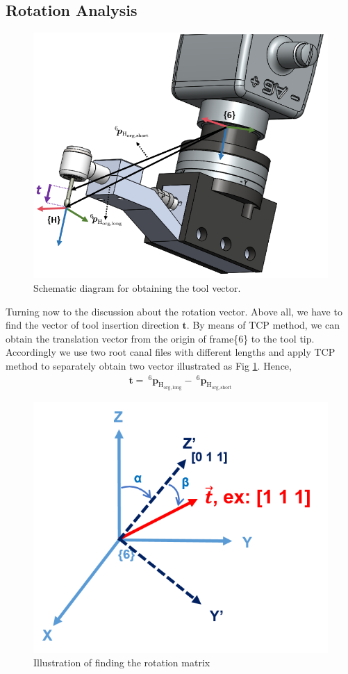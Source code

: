 \subsection{Rotation Analysis}
\label{sec:rot inf}
\begin{figure}[htbp]
\begin{center}
\includegraphics[width=0.7\linewidth]{Images/TCP2.png}
\end{center}
\caption{ 
Schematic diagram for obtaining the tool vector. 
}\label{fig:tcp2}
\end{figure}
Turning now to the discussion about the rotation vector. Above all, we have to find the vector of tool insertion direction $\boldsymbol{t}$. By means of TCP method, we can obtain the translation vector from the origin of frame\{6\} to the tool tip. Accordingly we use two root canal files with different lengths and apply TCP method to separately obtain two vector illustrated as Fig \ref{fig:tcp2}. Hence, 
\begin{equation}
\begin{split}
\boldsymbol{t} =\ ^\mathrm{6}\!\boldsymbol{p}_\mathrm{H_{org,long}} -\ ^\mathrm{6}\!\boldsymbol{p}_\mathrm{H_{org,short}}
\end{split}
\end{equation}
\begin{figure}[H]
\begin{center}
\includegraphics[width=0.6\linewidth]{Images/rot_inf.png}
\end{center}
\caption{
Illustration of finding the rotation matrix
}\label{fig:rot_inf}
\end{figure} 
